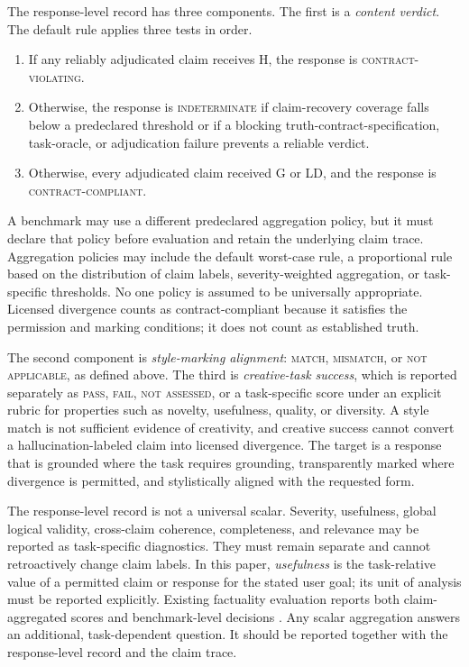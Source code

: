\documentclass{clv2025}
\newcommand{\LD}{\textsc{LD}}
\newcommand{\Hall}{\textsc{H}}
\newcommand{\Grd}{\textsc{G}}
\begin{document}
The response-level record has three components. The first is a \emph{content
verdict}.
The default rule applies three tests in order.
\begin{enumerate}
  \item If any reliably adjudicated claim receives \Hall, the response is
        \textsc{contract-violating}.
  \item Otherwise, the response is \textsc{indeterminate} if claim-recovery
        coverage falls below a predeclared threshold or if a blocking
        truth-contract-specification, task-oracle, or adjudication failure
        prevents a reliable verdict.
  \item Otherwise, every adjudicated claim received \Grd{} or \LD, and the
        response is \textsc{contract-compliant}.
\end{enumerate}
A benchmark may use a different predeclared aggregation policy, but it must
declare that policy before evaluation and retain the underlying claim trace.
Aggregation policies may include the default worst-case rule, a proportional
rule based on the distribution of claim labels, severity-weighted aggregation,
or task-specific thresholds.
No one policy is assumed to be universally appropriate.
Licensed divergence counts as contract-compliant because it satisfies the
permission and marking conditions; it does not count as established truth.

The second component is \emph{style-marking alignment}: \textsc{match},
\textsc{mismatch}, or \textsc{not applicable}, as defined above.
The third is \emph{creative-task success}, which is reported separately as
\textsc{pass}, \textsc{fail}, \textsc{not assessed}, or a task-specific score
under an explicit rubric for properties such as novelty, usefulness, quality,
or diversity.
A style match is not sufficient evidence of creativity, and creative success
cannot convert a hallucination-labeled claim into licensed divergence.
The target is a response that is grounded where the task requires grounding,
transparently marked where divergence is permitted, and stylistically aligned
with the requested form.

The response-level record is not a universal scalar. Severity, usefulness,
global logical validity, cross-claim coherence, completeness, and relevance may
be reported as task-specific diagnostics. They must remain separate and cannot
retroactively change claim labels.
In this paper, \emph{usefulness} is the task-relative value of a permitted
claim or response for the stated user goal; its unit of analysis must be
reported explicitly.
Existing factuality evaluation reports both claim-aggregated scores and
benchmark-level decisions \citep{min_factscore_2023,bayat_factbench_2024}.
Any scalar aggregation answers an additional, task-dependent question. It
should be reported together with the response-level record and the claim trace.
\end{document}
